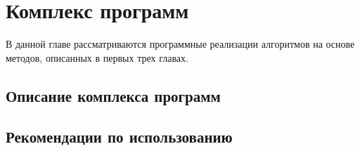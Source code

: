 \chapter{Комплекс программ}

В данной главе рассматриваются программные реализации алгоритмов на основе методов, описанных в первых трех главах. 

\newpage
\section{Описание комплекса программ}
\section{Рекомендации по использованию}